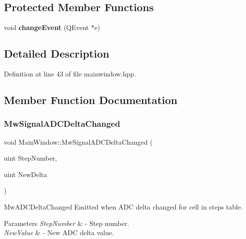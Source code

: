 \subsection*{Protected Member Functions}
\begin{DoxyCompactItemize}
\item 
\mbox{\label{class_main_window_af4ca5d0d3d18ddcb7d54b6596bbf4797}} 
void {\bfseries change\+Event} (Q\+Event $\ast$e)
\end{DoxyCompactItemize}


\subsection{Detailed Description}


Definition at line 43 of file mainwindow.\+hpp.



\subsection{Member Function Documentation}
\mbox{\label{class_main_window_a37ea64ccb9b5bcf9bb976602d42aadfa}} 
\subsubsection{\texorpdfstring{Mw\+Signal\+A\+D\+C\+Delta\+Changed}{MwSignalADCDeltaChanged}}
{\footnotesize\ttfamily void Main\+Window\+::\+Mw\+Signal\+A\+D\+C\+Delta\+Changed (\begin{DoxyParamCaption}\item[{uint}]{Step\+Number,  }\item[{uint}]{New\+Delta }\end{DoxyParamCaption})\hspace{0.3cm}{\ttfamily [signal]}}



Mw\+A\+D\+C\+Delta\+Changed Emitted when A\+DC delta changed for cell in steps table. 


\begin{DoxyParams}{Parameters}
{\em Step\+Number} & -\/ Step number. \\
\hline
{\em New\+Value} & -\/ New A\+DC delta value. \\
\hline
\end{DoxyParams}
\mbox{\label{class_main_window_a7b5fab96f0c2363958436141a3aae65b}} 
